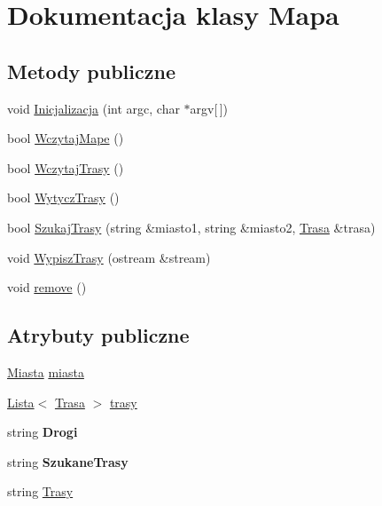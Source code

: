 \hypertarget{class_mapa}{}\section{Dokumentacja klasy Mapa}
\label{class_mapa}
\subsection*{Metody publiczne}
\begin{DoxyCompactItemize}
\item 
void \mbox{\hyperlink{class_mapa_a4f087082b229de353eed60aa5732cc9e}{Inicjalizacja}} (int argc, char $\ast$argv\mbox{[}$\,$\mbox{]})
\item 
bool \mbox{\hyperlink{class_mapa_a6651ec8e3fce840ae5f8e0d4b2c551b8}{Wczytaj\+Mape}} ()
\item 
bool \mbox{\hyperlink{class_mapa_a898b171c3b98692cb71ced3959ef4702}{Wczytaj\+Trasy}} ()
\item 
bool \mbox{\hyperlink{class_mapa_a01487ae9138832312922ea23577fcac4}{Wytycz\+Trasy}} ()
\item 
bool \mbox{\hyperlink{class_mapa_a80b6add069f75b6943244c2933d97b6a}{Szukaj\+Trasy}} (string \&miasto1, string \&miasto2, \mbox{\hyperlink{struct_trasa}{Trasa}} \&trasa)
\item 
void \mbox{\hyperlink{class_mapa_a4205fc2f39ebac415f9b76129a0c2c1d}{Wypisz\+Trasy}} (ostream \&stream)
\item 
void \mbox{\hyperlink{class_mapa_a5146461b9ba729d9824e6b0f2c3cd312}{remove}} ()
\end{DoxyCompactItemize}
\subsection*{Atrybuty publiczne}
\begin{DoxyCompactItemize}
\item 
\mbox{\hyperlink{class_miasta}{Miasta}} \mbox{\hyperlink{class_mapa_a114a3a690e8eeea081e8ef25bb4561c9}{miasta}}
\item 
\mbox{\hyperlink{class_lista}{Lista}}$<$ \mbox{\hyperlink{struct_trasa}{Trasa}} $>$ \mbox{\hyperlink{class_mapa_aad92737082c0fc9bdc3cd16177b08bd3}{trasy}}
\item 
\mbox{\label{class_mapa_ac4c162ab93ee5bdd889f7b806caf12c2}} 
string {\bfseries Drogi}
\item 
\mbox{\label{class_mapa_a1e4dfbdc5c53aed8152714185f4c8739}} 
string {\bfseries Szukane\+Trasy}
\item 
string \mbox{\hyperlink{class_mapa_a1c030bb78d2e00479a4a0341540b48fe}{Trasy}}
\end{DoxyCompactItemize}


